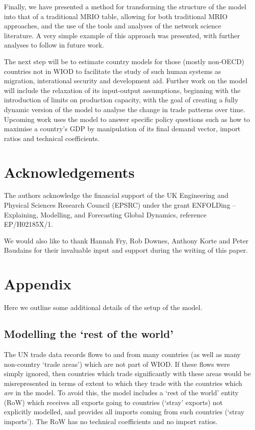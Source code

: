 \documentclass[a4paper]{article}
\begin{document}
Finally, we have presented a method for transforming the structure of the model into that of a traditional MRIO table, allowing for both traditional MRIO approaches, and the use of the tools and analyses of the network science literature.
A very simple example of this approach was presented, with further analyses to follow in future work.

The next step will be to estimate country models for those (mostly non-OECD) countries not in WIOD to facilitate the study of such human systems as migration, interational security and development aid.
Further work on the model will include the relaxation of its input-output assumptions, beginning with the introduction of limits on production capacity, with the goal of creating a fully dynamic version of the model to analyse the change in trade patterns over time.
Upcoming work uses the model to answer specific policy questions such as how to maximise a country's GDP by manipulation of its final demand vector, import ratios and technical coefficients.


\section*{Acknowledgements}

The authors acknowledge the financial support of the UK Engineering and Physical Sciences Research Council (EPSRC) under the grant ENFOLDing -- Explaining, Modelling, and Forecasting Global Dynamics, reference EP/H02185X/1. 

We would also like to thank Hannah Fry, Rob Downes, Anthony Korte and Peter Baudains for their invaluable input and support during the writing of this paper.


\printbibliography

\appendix
\section{Appendix}
Here we outline some additional details of the setup of the model.

\subsection{Modelling the `rest of the world'}\label{sec:RoW}
The UN trade data records flows to and from many countries (as well as many non-country `trade areas') which are not part of WIOD. If these flows were simply ignored, then countries which trade significantly with these areas would be misrepresented in terms of extent to which they trade with the countries which \textit{are} in the model. To avoid this, the model includes a `rest of the world' entity (RoW) which receives all exports going to countries (`stray' exports) not explicitly modelled, and provides all imports coming from such countries (`stray imports'). The RoW has no technical coefficients and no import ratios.
\end{document}
